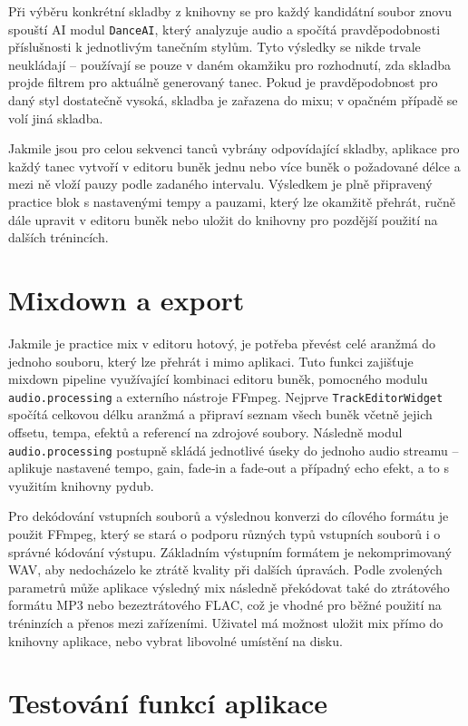\documentclass[12pt, a4paper,
]{report}
\begin{document}
Při výběru konkrétní skladby z knihovny se pro každý kandidátní soubor znovu spouští AI modul \texttt{DanceAI}, který analyzuje audio a spočítá pravděpodobnosti příslušnosti k jednotlivým tanečním stylům. Tyto výsledky se nikde trvale neukládají – používají se pouze v daném okamžiku pro rozhodnutí, zda skladba projde filtrem pro aktuálně generovaný tanec. Pokud je pravděpodobnost pro daný styl dostatečně vysoká, skladba je zařazena do mixu; v opačném případě se volí jiná skladba.

Jakmile jsou pro celou sekvenci tanců vybrány odpovídající skladby, aplikace pro každý tanec vytvoří v editoru buněk jednu nebo více buněk o požadované délce a mezi ně vloží pauzy podle zadaného intervalu. Výsledkem je plně připravený practice blok s nastavenými tempy a pauzami, který lze okamžitě přehrát, ručně dále upravit v editoru buněk nebo uložit do knihovny pro pozdější použití na dalších trénincích.

\section{Mixdown a export}

Jakmile je practice mix v editoru hotový, je potřeba převést celé aranžmá do jednoho souboru, který lze přehrát i mimo aplikaci. Tuto funkci zajišťuje mixdown pipeline využívající kombinaci editoru buněk, pomocného modulu \texttt{audio.processing} a externího nástroje FFmpeg. Nejprve \texttt{TrackEditorWidget} spočítá celkovou délku aranžmá a připraví seznam všech buněk včetně jejich offsetu, tempa, efektů a referencí na zdrojové soubory. Následně modul \texttt{audio.processing} postupně skládá jednotlivé úseky do jednoho audio streamu – aplikuje nastavené tempo, gain, fade‑in a fade‑out a případný echo efekt, a to s využitím knihovny pydub.

Pro dekódování vstupních souborů a výslednou konverzi do cílového formátu je použit FFmpeg, který se stará o podporu různých typů vstupních souborů i o správné kódování výstupu. Základním výstupním formátem je nekomprimovaný WAV, aby nedocházelo ke ztrátě kvality při dalších úpravách. Podle zvolených parametrů může aplikace výsledný mix následně překódovat také do ztrátového formátu MP3 nebo bezeztrátového FLAC, což je vhodné pro běžné použití na tréninzích a přenos mezi zařízeními. Uživatel má možnost uložit mix přímo do knihovny aplikace, nebo vybrat libovolné umístění na disku.
\newpage
\section{Testování funkcí aplikace}
\end{document}
